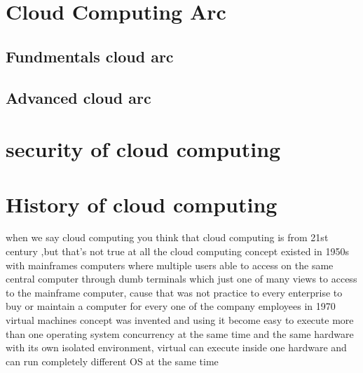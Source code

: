 \documentclass [12pt]{book}
\begin{document}
	\chapter{Cloud Computing Arc}
	\section{Fundmentals cloud arc}
    \section{Advanced cloud arc}
    \chapter{security of cloud computing}
    
    
    
    
    \chapter{History of cloud computing}
    
    
    when we say cloud computing you think that cloud computing is from 21st century ,but that's not true at all the cloud computing concept existed in 1950s with mainframes computers where multiple users able to access on the same central computer through dumb terminals which just one of many views to access to the mainframe computer, cause that was not practice to every enterprise to buy or maintain a computer for every one of the company employees 
  \newline
  \newline
  \newline
    in 1970 virtual machines concept was invented and using it become easy to execute more than one operating system concurrency at the same time and the same hardware with its own isolated environment, virtual can execute inside one hardware and can run completely different OS at the same time 
    \newline
    \newline
    \newline
    
   
\end{document}

